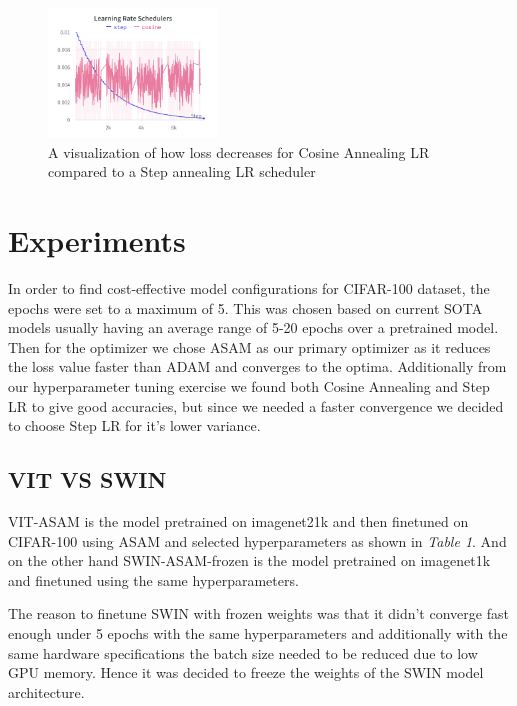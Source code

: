\documentclass{article}
\begin{document}
\begin{figure}[ht]
    \vskip 0.2in
    \centering
    \includegraphics[width=0.4\textwidth]{learning_rate_schedulers.png}
    \caption{A visualization of how loss decreases for Cosine Annealing LR compared to a Step annealing LR scheduler}
    \label{fig:foobar}
    \vskip -0.2in
\end{figure}


\section{Experiments}
In order to find cost-effective model configurations for CIFAR-100 dataset, the epochs were set to a maximum of 5.
This was chosen based on current SOTA models usually having an average range of 5-20 epochs over a pretrained model.
Then for the optimizer we chose ASAM as our primary optimizer as it reduces the loss value faster than ADAM and converges to the optima.
Additionally from our hyperparameter tuning exercise we found both Cosine Annealing and Step LR to give good accuracies, but since we needed a faster convergence we decided to choose Step LR for it's lower variance.

\subsection{VIT VS SWIN}
VIT-ASAM is the model pretrained on imagenet21k and then finetuned on CIFAR-100 using ASAM and selected hyperparameters as shown in \textit{Table 1}.
And on the other hand SWIN-ASAM-frozen is the model pretrained on imagenet1k and finetuned using the same hyperparameters.

The reason to finetune SWIN with frozen weights was that it didn't converge fast enough under 5 epochs with the same hyperparameters and additionally with the same hardware specifications the batch size needed to be reduced due to low GPU memory.
Hence it was decided to freeze the weights of the SWIN model architecture.
\end{document}
